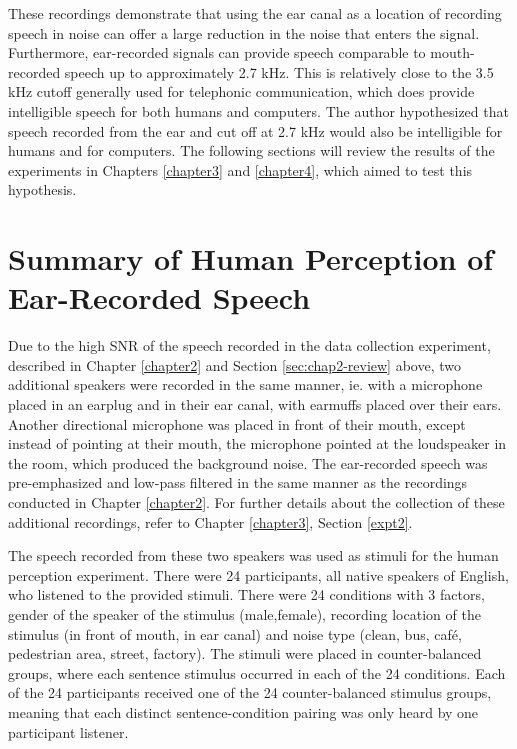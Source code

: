 These recordings demonstrate that using the ear canal as a location of recording speech in noise can offer a large reduction in the noise that enters the signal.  Furthermore, ear-recorded signals can provide speech comparable to mouth-recorded speech up to approximately 2.7 kHz.  This is relatively close to the 3.5 kHz cutoff generally used for telephonic communication, which does provide intelligible speech for both humans and computers. The author hypothesized that speech recorded from the ear and cut off at 2.7 kHz would also be intelligible for humans and for computers.  The following sections will review the results of the experiments in Chapters \ref{chapter3} and \ref{chapter4}, which aimed to test this hypothesis.


\section{Summary of Human Perception of Ear-Recorded Speech}\label{sec:chap3-review}

Due to the high SNR of the speech recorded in the data collection experiment, described in Chapter \ref{chapter2} and Section \ref{sec:chap2-review} above, two additional speakers were recorded in the same manner, ie. with a microphone placed in an earplug and in their ear canal, with earmuffs placed over their ears.  Another directional microphone was placed in front of their mouth, except instead of pointing at their mouth, the microphone pointed at the loudspeaker in the room, which produced the background noise. The ear-recorded speech was pre-emphasized and low-pass filtered in the same manner as the recordings conducted in Chapter \ref{chapter2}. For further details about the collection of these additional recordings, refer to Chapter \ref{chapter3}, Section \ref{expt2}.

The speech recorded from these two speakers was used as stimuli for the human perception experiment.  There were 24 participants, all native speakers of English, who listened to the provided stimuli.  There were 24 conditions with 3 factors, gender of the speaker of the stimulus (male,female), recording location of the stimulus (in front of mouth, in ear canal) and noise type (clean, bus, caf\'{e}, pedestrian area, street, factory).  The stimuli were placed in counter-balanced groups, where each sentence stimulus occurred in each of the 24 conditions.  Each of the 24 participants received one of the 24 counter-balanced stimulus groups, meaning that each distinct sentence-condition pairing was only heard by one participant listener.

